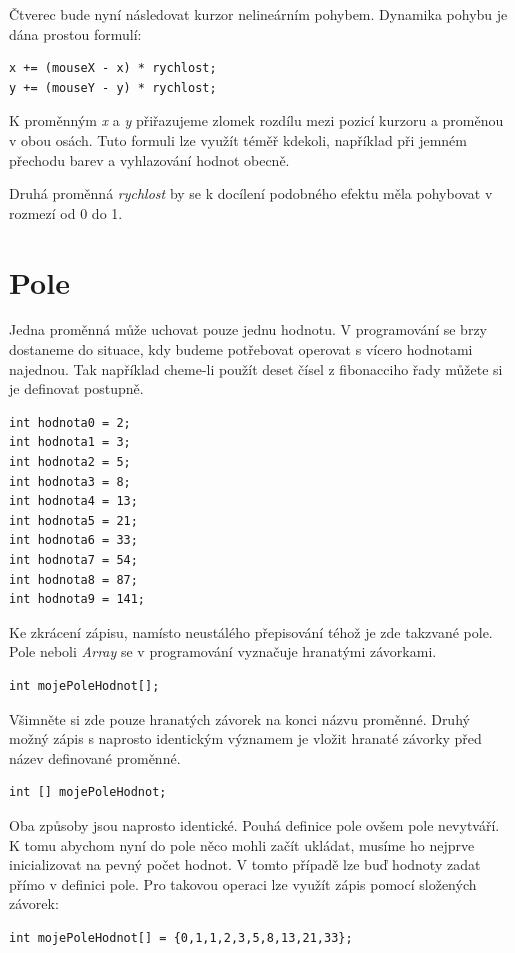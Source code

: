 \documentclass[10pt]{book}
\newcommand{\oddil}[1]{\section{#1}\index{#1}\label{#1}}
\begin{document}
Čtverec bude nyní následovat kurzor nelineárním pohybem. Dynamika pohybu je dána prostou formulí:
\begin{lstlisting}
x += (mouseX - x) * rychlost;
y += (mouseY - y) * rychlost; 
\end{lstlisting}
K proměnným {\em x} a {\em y} přiřazujeme zlomek rozdílu mezi pozicí kurzoru a proměnou v obou osách. Tuto formuli lze využít téměř kdekoli, například při jemném přechodu barev a vyhlazování hodnot obecně.

Druhá proměnná {\em rychlost} by se k docílení podobného efektu měla pohybovat v rozmezí od 0 do 1.


\oddil{Pole}

Jedna proměnná může uchovat pouze jednu hodnotu. V programování se brzy dostaneme do situace, kdy budeme potřebovat operovat s vícero hodnotami najednou. Tak například cheme-li použít deset čísel z fibonacciho řady můžete si je definovat postupně.

\begin{lstlisting}
int hodnota0 = 2;
int hodnota1 = 3;
int hodnota2 = 5;
int hodnota3 = 8;
int hodnota4 = 13;
int hodnota5 = 21;
int hodnota6 = 33;
int hodnota7 = 54;
int hodnota8 = 87;
int hodnota9 = 141;
\end{lstlisting}


Ke zkrácení zápisu, namísto neustálého přepisování téhož je zde takzvané pole. Pole neboli {\em Array} se v programování vyznačuje hranatými závorkami.

\begin{lstlisting}
int mojePoleHodnot[];
\end{lstlisting}

Všimněte si zde pouze hranatých závorek na konci názvu proměnné. Druhý možný zápis s naprosto identickým významem je vložit hranaté závorky před název definované proměnné.


\begin{lstlisting}
int [] mojePoleHodnot;
\end{lstlisting}

Oba způsoby jsou naprosto identické. Pouhá definice pole ovšem pole nevytváří. K tomu abychom nyní do pole něco mohli začít ukládat, musíme ho nejprve inicializovat na pevný počet hodnot. V tomto případě lze buď hodnoty zadat přímo v definici pole. Pro takovou operaci lze využít zápis pomocí složených závorek:

\begin{lstlisting}
int mojePoleHodnot[] = {0,1,1,2,3,5,8,13,21,33};
\end{lstlisting}
\end{document}
